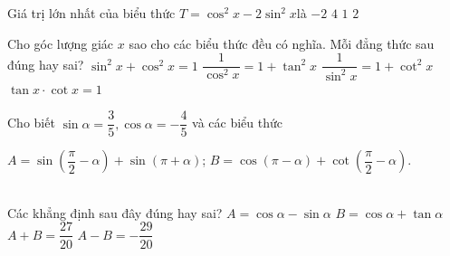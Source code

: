 \begin{ex}%
	Giá trị lớn nhất của biểu thức  $ T=\cos^2x-2\sin^2x$là
	 \choice
		 {$-2$}
		{$ 4$} 
		{\True  $ 1$}
		{$ 2$} 
\end{ex}



\begin{ex}%
 Cho góc lượng giác  $x$ sao cho các biểu thức đều có nghĩa. Mỗi đẳng thức sau đúng hay sai?
  \choiceTF
  {\True $\sin^2x+\cos^2x=1$} 
  {\True $\dfrac{1}{\cos^2x}=1+\tan^2x$} 
  {\True $\dfrac{1}{\sin^2x}=1+\cot^2x$} 
  {\True $\tan x\cdot\cot  x=1$}
\end{ex}

\begin{ex}%
 Cho biết  $\sin\alpha=\dfrac{3}{5},\cos\alpha=-\dfrac{4}{5}$ và các biểu thức \\
 \centerline{$ A=\sin\left(\dfrac{\pi}{2}-\alpha\right)+\sin (\pi+\alpha)$; $  B=\cos (\pi-\alpha)+\cot\left(\dfrac{\pi}{2}-\alpha\right)$.} \\
 Các khẳng  định sau đây đúng hay sai?
  \choiceTF
  {\True $ A=\cos\alpha-\sin\alpha $} 
  {$ B=\cos\alpha+\tan\alpha $} 
  {$ A+B=\dfrac{27}{20}$} 
  {\True  $ A-B=-\dfrac{29}{20}$}
\end{ex}

